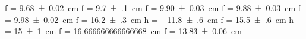 f = \SI{+9.68(2)}{\centi\meter}
f = \SI{+9.7(1)}{\centi\meter}
f = \SI{+9.90(3)}{\centi\meter}
f = \SI{+9.88(3)}{\centi\meter}
f = \SI{+9.98(2)}{\centi\meter}
f = \SI{+16.2(3)}{\centi\meter}
h = \SI{-11.8(6)}{\centi\meter}
f = \SI{+15.5(6)}{\centi\meter}
h- = \SI{+15(1)}{\centi\meter}
f = \SI[]{16.666666666666668}{\centi\meter}
f = \SI{+13.83(6)}{\centi\meter}
